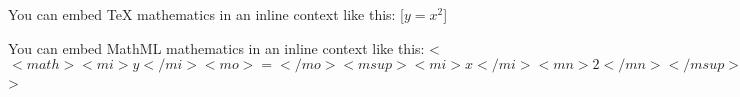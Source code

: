 You can embed TeX mathematics in an inline context like this: [$y=x^2$]

You can embed MathML mathematics in an inline context like this: <$<math><mi>y</mi><mo>=</mo><msup><mi>x</mi><mn>2</mn></msup></math>$>

